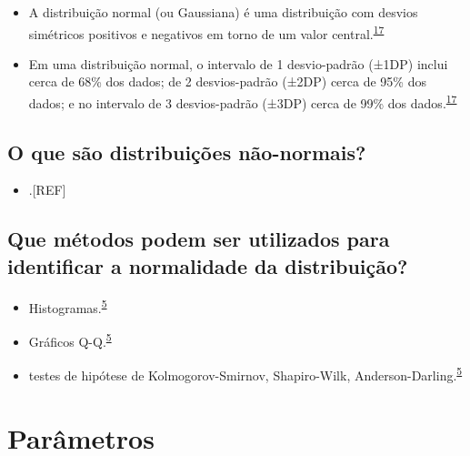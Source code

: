 \documentclass[
]{book}
\providecommand{\tightlist}{%
  \setlength{\itemsep}{0pt}\setlength{\parskip}{0pt}}
\begin{document}
\begin{itemize}
\item
  A distribuição normal (ou Gaussiana) é uma distribuição com desvios simétricos positivos e negativos em torno de um valor central.\textsuperscript{\protect\hyperlink{ref-Ali2016}{17}}
\item
  Em uma distribuição normal, o intervalo de 1 desvio-padrão (±1DP) inclui cerca de 68\% dos dados; de 2 desvios-padrão (±2DP) cerca de 95\% dos dados; e no intervalo de 3 desvios-padrão (±3DP) cerca de 99\% dos dados.\textsuperscript{\protect\hyperlink{ref-Ali2016}{17}}
\end{itemize}

\hypertarget{o-que-suxe3o-distribuiuxe7uxf5es-nuxe3o-normais}{%
\subsection{O que são distribuições não-normais?}\label{o-que-suxe3o-distribuiuxe7uxf5es-nuxe3o-normais}}

\begin{itemize}
\tightlist
\item
  .{[}REF{]}
\end{itemize}

\hypertarget{que-muxe9todos-podem-ser-utilizados-para-identificar-a-normalidade-da-distribuiuxe7uxe3o}{%
\subsection{Que métodos podem ser utilizados para identificar a normalidade da distribuição?}\label{que-muxe9todos-podem-ser-utilizados-para-identificar-a-normalidade-da-distribuiuxe7uxe3o}}

\begin{itemize}
\item
  Histogramas.\textsuperscript{\protect\hyperlink{ref-vetter2017}{5}}
\item
  Gráficos Q-Q.\textsuperscript{\protect\hyperlink{ref-vetter2017}{5}}
\item
  testes de hipótese de Kolmogorov-Smirnov, Shapiro-Wilk, Anderson-Darling.\textsuperscript{\protect\hyperlink{ref-vetter2017}{5}}
\end{itemize}

\hypertarget{parametros}{%
\section{Parâmetros}\label{parametros}}
\end{document}
